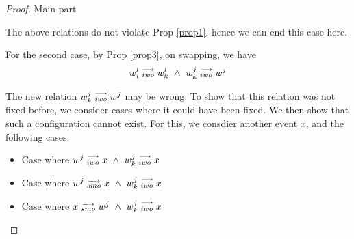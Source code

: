\begin{proof}{Main part}
\begin{itemize}
                        The above relations do not violate Prop \ref{prop1}, hence we can end this case here. 

                        For the second case, by Prop \ref{prop3}, on swapping, we have 
                        \begin{align*}
                            \reln{w_i^l}{iwo}{w_k^l} \ \wedge \ \reln{w_k^j}{iwo}{w^j}
                        \end{align*}

                        The new relation $w_k^j\stackrel{\longrightarrow}{_{iwo}}w^j$ may be wrong. 
                        To show that this relation was not fixed before, we consider cases where it could have been fixed. We then show that such a configuration cannot exist. For this, we consdier another event $x$, and the following cases:

                        \begin{itemize}
                            \item Case where $w^j\stackrel{\longrightarrow}{_{iwo}}x \ \wedge \ w_k^j\stackrel{\longrightarrow}{_{iwo}}x$


                            \item Case where $w^j\stackrel{\longrightarrow}{_{smo}}x \ \wedge \ w_k^j\stackrel{\longrightarrow}{_{iwo}}x$


                            \item Case where $x\stackrel{\longrightarrow}{_{smo}}w^j \ \wedge \ w_k^j\stackrel{\longrightarrow}{_{iwo}}x$


\end{itemize}
\end{itemize}
\end{proof}
